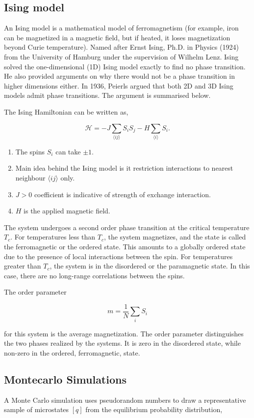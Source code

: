 \documentclass[5p,authoryear]{elsarticle}
\begin{document}
\subsection{Ising model}
An Ising model is a mathematical model of ferromagnetism (for example, iron can be magnetized in a magnetic field, but if heated, it loses magnetization beyond Curie temperature). Named after Ernst Ising, Ph.D. in Physics (1924) from the University of Hamburg under the supervision of Wilhelm Lenz. Ising solved the one-dimensional (1D) Ising model exactly to find no phase transition. He also provided arguments on why there would not be a phase transition in higher dimensions either. In 1936, Peierls argued that both 2D and 3D Ising models admit phase transitions. The argument is summarised below.

The Ising Hamiltonian can be written as,

$$\mathcal{H} = -J \sum_{\langle i j \rangle} S_{i} S_{j} - H\sum_{\langle i \rangle} S_{i}.$$

\begin{enumerate}
  \item The spins $S_i$ can take $\pm 1$.
  \item Main idea behind the Ising model is it restriction interactions to nearest neighbour $\langle ij \rangle$ only.
  \item $J > 0$ coefficient is indicative of strength of exchange interaction.
  \item $H$ is the applied magnetic field.
\end{enumerate}

The system undergoes a second order phase transition at the critical temperature $T_{c}$. For temperatures less than $T_{c}$, the system magnetizes, and the state is called the ferromagnetic or the ordered state. This amounts to a globally ordered state due to the presence of local interactions between the spin. For temperatures greater than $T_{c}$, the system is in the disordered or the paramagnetic state. In this case, there are no long-range correlations between the spins.

The order parameter

$$m = \frac{1}{N}\sum_i S_i$$

for this system is the average magnetization. The order parameter distinguishes the two phases realized by the systems. It is zero in the disordered state, while non-zero in the ordered, ferromagnetic, state.

\subsection{Montecarlo Simulations}
A Monte Carlo simulation uses pseudorandom numbers to draw a representative sample of microstates $[q]$ from the equilibrium probability distribution,
\end{document}

